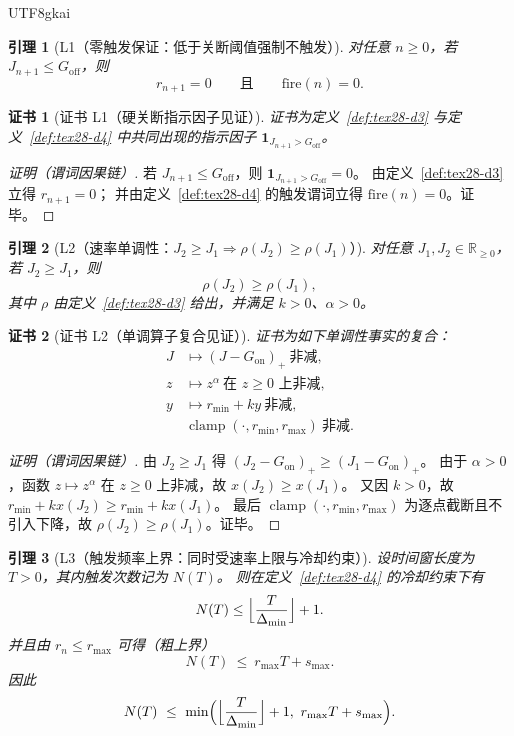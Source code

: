 \documentclass[12pt]{article}
\newtheorem{lemma}{引理}[section]
\newtheorem{Certificate}{证书}[section]
\newcommand{\RR}{\mathbb{R}}
\newcommand{\indicator}[1]{\mathbf{1}_{#1}}
\newcommand{\clamp}{\operatorname{clamp}}
\begin{document}
\begin{CJK*}{UTF8}{gkai}
\begin{lemma}[L1（零触发保证：低于关断阈值强制不触发）]
\label{lem:tex28-l1}
对任意 $n\ge 0$，若 $J_{n+1}\le G_{\mathrm{off}}$，则
\[
  r_{n+1}=0
  \qquad\text{且}\qquad
  \mathrm{fire}(n)=0.
\]
\end{lemma}

\begin{Certificate}[证书 L1（硬关断指示因子见证）]
\label{cert:tex28-l1}
证书为定义~\ref{def:tex28-d3} 与定义~\ref{def:tex28-d4} 中共同出现的指示因子 $\indicator{J_{n+1}>G_{\mathrm{off}}}$。
\end{Certificate}

\begin{proof}[证明（谓词因果链）]
若 $J_{n+1}\le G_{\mathrm{off}}$，则 $\indicator{J_{n+1}>G_{\mathrm{off}}}=0$。
由定义~\ref{def:tex28-d3} 立得 $r_{n+1}=0$；
并由定义~\ref{def:tex28-d4} 的触发谓词立得 $\mathrm{fire}(n)=0$。证毕。
\end{proof}

\begin{lemma}[L2（速率单调性：$J_2\ge J_1\Rightarrow \rho(J_2)\ge \rho(J_1)$）]
\label{lem:tex28-l2}
对任意 $J_1,J_2\in\RR_{\ge 0}$，若 $J_2\ge J_1$，则
\[
  \rho(J_2)\ge \rho(J_1),
\]
其中 $\rho$ 由定义~\ref{def:tex28-d3} 给出，并满足 $k>0$、$\alpha>0$。
\end{lemma}

\begin{Certificate}[证书 L2（单调算子复合见证）]
\label{cert:tex28-l2}
证书为如下单调性事实的复合：
\[
  \begin{aligned}
    J&\mapsto (J-G_{\mathrm{on}})_{+}\ \text{非减},\\
    z&\mapsto z^{\alpha}\ \text{在 }z\ge 0\text{ 上非减},\\
    y&\mapsto r_{\min}+k y\ \text{非减},\\
    &\clamp(\cdot,r_{\min},r_{\max})\ \text{非减}.
  \end{aligned}
\]
\end{Certificate}

\begin{proof}[证明（谓词因果链）]
由 $J_2\ge J_1$ 得 $(J_2-G_{\mathrm{on}})_{+}\ge (J_1-G_{\mathrm{on}})_{+}$。
由于 $\alpha>0$，函数 $z\mapsto z^\alpha$ 在 $z\ge 0$ 上非减，故 $x(J_2)\ge x(J_1)$。
又因 $k>0$，故 $r_{\min}+k x(J_2)\ge r_{\min}+k x(J_1)$。
最后 $\clamp(\cdot,r_{\min},r_{\max})$ 为逐点截断且不引入下降，故 $\rho(J_2)\ge \rho(J_1)$。证毕。
\end{proof}

\begin{lemma}[L3（触发频率上界：同时受速率上限与冷却约束）]
\label{lem:tex28-l3}
设时间窗长度为 $T>0$，其内触发次数记为 $N(T)$。
则在定义~\ref{def:tex28-d4} 的冷却约束下有
\[
  N(T)\le \Bigl\lfloor \frac{T}{\Delta_{\min}}\Bigr\rfloor + 1.
\]
并且由 $r_{n}\le r_{\max}$ 可得（粗上界）
\[
  N(T)\ \le\ r_{\max}T+s_{\max}.
\]
因此
\[
  N(T)\ \le\ \min\Bigl(\Bigl\lfloor \frac{T}{\Delta_{\min}}\Bigr\rfloor + 1,\ r_{\max}T+s_{\max}\Bigr).
\]
\end{lemma}


\end{CJK*}
\end{document}
